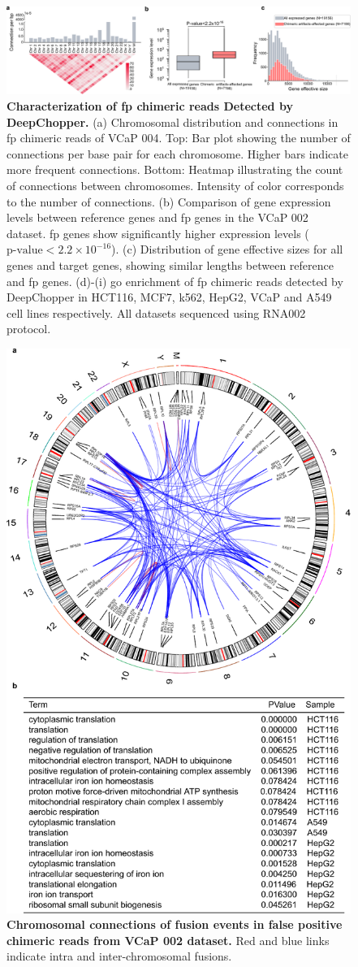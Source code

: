 \documentclass[pdflatex,sn-nature, lineno]{sn-jnl}%
\theoremstyle{thmstyleone}%
\theoremstyle{thmstyletwo}%
\theoremstyle{thmstylethree}%
\begin{document}
\begin{figure}[!h]
	\includegraphics[height=0.26\columnwidth]{finals/sf2}
	\caption{ {\bf Characterization of \gls{fp} chimeric reads Detected by DeepChopper.} (a) Chromosomal distribution and connections in \gls{fp} chimeric reads of VCaP 004. Top: Bar plot showing the number of connections per base pair for each chromosome. Higher bars indicate more frequent connections. Bottom: Heatmap illustrating the count of connections between chromosomes. Intensity of color corresponds to the number of connections. (b) Comparison of gene expression levels between reference genes and \gls{fp} genes in the VCaP 002 dataset. \gls{fp} genes show significantly higher expression levels (\(\textrm{p-value} < 2.2 \times 10^{-16}\)). (c) Distribution of gene effective sizes for all genes and target genes, showing similar lengths between reference and \gls{fp} genes. (d)-(i) \gls{go} enrichment of \gls{fp} chimeric reads detected by DeepChopper in HCT116, MCF7, k562, HepG2, VCaP and A549 cell lines respectively. All datasets sequenced using RNA002 protocol.}\label{fig:sf2}
\end{figure}

\begin{figure}[!h]
	\includegraphics[height=1\columnwidth]{finals/sf3}
	\caption{ {\bf Chromosomal connections of fusion events in false positive chimeric reads from VCaP 002 dataset.} Red and blue links indicate intra and inter-chromosomal fusions.}
	\label{fig:sf3}
\end{figure}
\end{document}

